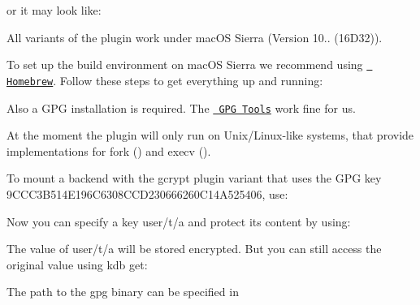 or it may look like\+:


\begin{DoxyCode}{0}
\end{DoxyCode}


All variants of the plugin work under mac\+OS Sierra (Version 10.. (16D32)).

To set up the build environment on mac\+OS Sierra we recommend using \href{http://brew.sh/}{\texttt{ Homebrew}}. Follow these steps to get everything up and running\+:


\begin{DoxyCode}{0}
\end{DoxyCode}


Also a G\+PG installation is required. The \href{https://gpgtools.org}{\texttt{ G\+PG Tools}} work fine for us.

At the moment the plugin will only run on Unix/\+Linux-\/like systems, that provide implementations for {\ttfamily fork ()} and {\ttfamily execv ()}.

To mount a backend with the gcrypt plugin variant that uses the G\+PG key 9C\+C\+C3\+B514\+E196\+C6308\+C\+C\+D230666260\+C14\+A525406, use\+:


\begin{DoxyCode}{0}
\end{DoxyCode}


Now you can specify a key {\ttfamily user/t/a} and protect its content by using\+:


\begin{DoxyCode}{0}
\end{DoxyCode}


The value of {\ttfamily user/t/a} will be stored encrypted. But you can still access the original value using {\ttfamily kdb get}\+:


\begin{DoxyCode}{0}
\end{DoxyCode}


The path to the gpg binary can be specified in


